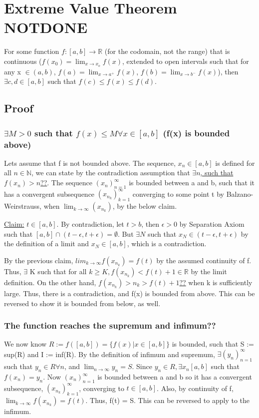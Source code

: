 \documentclass[11 pt, twoside]{article}
\begin{document}
\section{Extreme Value Theorem NOTDONE}
For some function $f:[a, b] \to \mathbb{R}$ (for the codomain, not the range) that is continuous ($f(x_0) = \lim_{x \to x_o}f(x)$, extended to open intervals such that for any x $\in (a, b)$, $f(a) = \lim_{x \to a^+}f(x)$, $f(b) = \lim_{x \to b^-}f(x)$), then $\exists c, d \in [a, b]$ such that $f(c) \leq f(x) \leq f(d)$.

\subsection{Proof}
\subsubsection{$\exists M>0$ such that $f(x) \leq  M \forall x \in [a,b]$ (f(x) is bounded above)}
Lets assume that f is not bounded above. The sequence, $x_n \in [a, b]$ is defined for all $n \in \mathbb{N}$, we can state by the contradiction assumption that \underline{$\exists n$, such that $f(x_n) > n$??}.
The sequence $(x_n)^\infty_{n=1}$ is bounded between a and b, such that it has a convergent subsequence $(x_{n_k})^\infty_{k=1}$ converging to some point t by Balzano-Weirstrauss, when $ \lim_{k \to \infty}(x_{n_k})$, by the below claim.\par
\underline{Claim:} $t \in [a, b]$. By contradiction, 
let $t>b$, then $\epsilon > 0$ by Separation Axiom such that $[a, b] \cap (t-\epsilon, t+\epsilon) = \emptyset$. But $\exists N$ such that $x_N \in (t-\epsilon, t+\epsilon)$ by the definition of a limit and $x_N \in [a, b]$, which is a contradiction.

By the previous claim, $lim_{k \to \infty}f(x_{n_k}) = f(t)$ by the assumed continuity of f. Thus, $\exists$ K such that for all $k \geq K, f(x_{n_k}) < f(t) + 1 \in \mathbb{R}$ by the limit definition. On the other hand, \underline{$f(x_{n_k}) > n_k > f(t) + 1$??} when k is sufficiently large. Thus, there is a contradiction, and f(x) is bounded from above. This can be reversed to show it is bounded from below, as well.

\subsubsection{The function reaches the supremum and infimum??}
We now know $R := f([a, b]) = \{f(x) | x \in [a, b]\}$ is bounded, such that S := sup(R) and I := inf(R). By the definition of infimum and supremum, $\exists (y_n)^\infty_{n = 1}$ such that $y_n \in R  \forall n$, and $\lim_{n \to \infty}y_n = S$. Since $y_n \in R, \exists x_n [a, b]$ such that $f(x_n) = y_n$. Now $(x_n)^\infty_{n=1}$ is bounded between a and b so it has a convergent subsequence, $(x_{n_k})^\infty_{k=1}$, converging to $t \in [a, b]$. Also, by continuity of f, $\lim_{k \to \infty}f(x_{n_k}) = f(t)$. Thus, f(t) = S. This can be reversed to apply to the infimum.
\end{document}

